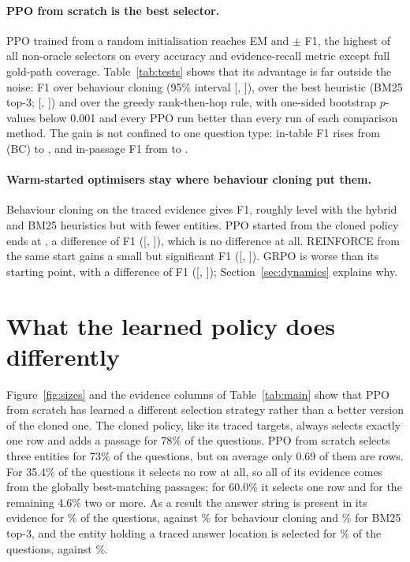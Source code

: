 \paragraph{PPO from scratch is the best selector.} PPO trained from a random initialisation reaches \emScratch{} EM and \fScratch{}$\pm$\fScratchStd{} F1, the highest of all non-oracle selectors on every accuracy and evidence-recall metric except full gold-path coverage. Table~\ref{tab:tests} shows that its advantage is far outside the noise: \dScratchBc{} F1 over behaviour cloning (95\% interval [\dScratchBcLo, \dScratchBcHi]), \dScratchBm{} over the best heuristic (BM25 top-3; [\dScratchBmLo, \dScratchBmHi]) and \dScratchGreedy{} over the greedy rank-then-hop rule, with one-sided bootstrap $p$-values below 0.001 and every PPO run better than every run of each comparison method. The gain is not confined to one question type: in-table F1 rises from \ftabBc{} (BC) to \ftabScratch{}, and in-passage F1 from \fpsgBc{} to \fpsgScratch{}.

\paragraph{Warm-started optimisers stay where behaviour cloning put them.} Behaviour cloning on the traced evidence gives \fBc{} F1, roughly level with the hybrid and BM25 heuristics but with fewer entities. PPO started from the cloned policy ends at \fPpo{}, a difference of \dPpoBc{} F1 ([\dPpoBcLo, \dPpoBcHi]), which is no difference at all. REINFORCE from the same start gains a small but significant \dReinforceBc{} F1 ([\dReinforceBcLo, \dReinforceBcHi]). GRPO is worse than its starting point, with a difference of \dGrpoBc{} F1 ([\dGrpoBcLo, \dGrpoBcHi]); Section~\ref{sec:dynamics} explains why.



\section{What the learned policy does differently}
\label{sec:behaviour}

Figure~\ref{fig:sizes} and the evidence columns of Table~\ref{tab:main} show that PPO from scratch has learned a different selection strategy rather than a better version of the cloned one. The cloned policy, like its traced targets, always selects exactly one row and adds a passage for 78\% of the questions. PPO from scratch selects three entities for 73\% of the questions, but on average only 0.69 of them are rows. For 35.4\% of the questions it selects no row at all, so all of its evidence comes from the globally best-matching passages; for 60.0\% it selects one row and for the remaining 4.6\% two or more. As a result the answer string is present in its evidence for \ansrecScratch\% of the questions, against \ansrecBc\% for behaviour cloning and \ansrecBmThree\% for BM25 top-3, and the entity holding a traced answer location is selected for \locScratch\% of the questions, against \locBc\%.

